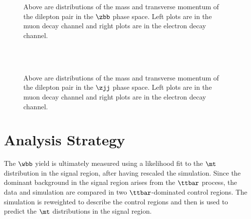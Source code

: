 \begin{figure}
      \center
  \\
  \\
      \caption{ Above are distributions of the mass and
        transverse momentum of the dilepton pair in the
        $\zbb$ phase space.
       Left plots are in the muon decay channel and right
        plots are in the electron decay channel.
      }
      \label{fig:prefit_dybb}
\end{figure}

\begin{figure}
      \center
  \\
  \\
      \caption{ Above are distributions of the mass and
        transverse momentum of the dilepton pair in the
        $\zjj$ phase space.
       Left plots are in the muon decay channel and right
        plots are in the electron decay channel.
      }
      \label{fig:prefit_dyjj}
\end{figure}


\section{Analysis Strategy}\label{subsec:wbb_analysisstrategy}
The $\wbb$ yield is ultimately measured using a likelihood fit
 to the $\mt$ distribution in the signal region,
 after having rescaled the simulation. 
Since the dominant background in the signal region arises
 from the $\ttbar$ process, the data and simulation
 are compared in two $\ttbar$-dominated control regions.
The simulation is reweighted to describe the control regions
 and then is used to predict the $\mt$ distributions
 in the signal region.

